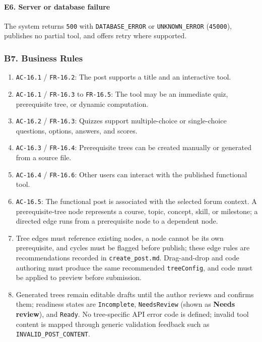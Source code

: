 \documentclass[12pt]{article}
\begin{document}
\hypertarget{sec:e6-server-or-database-failure}{}
\paragraph*{E6. Server or database failure}
\par\medskip

The system returns \texttt{500} with \texttt{DATABASE\_ERROR} or \texttt{UNKNOWN\_ERROR} (\texttt{45000}), publishes no partial tool, and offers retry where supported.
\par\medskip

\hypertarget{sec:b7-business-rules}{}
\subsubsection*{B7. Business Rules}
\par\medskip

\begin{enumerate}
\item \texttt{AC-16.1} / \texttt{FR-16.2}: The post supports a title and an interactive tool.
\item \texttt{AC-16.1} / \texttt{FR-16.3} to \texttt{FR-16.5}: The tool may be an immediate quiz, prerequisite tree, or dynamic computation.
\item \texttt{AC-16.2} / \texttt{FR-16.3}: Quizzes support multiple-choice or single-choice questions, options, answers, and scores.
\item \texttt{AC-16.3} / \texttt{FR-16.4}: Prerequisite trees can be created manually or generated from a source file.
\item \texttt{AC-16.4} / \texttt{FR-16.6}: Other users can interact with the published functional tool.
\item \texttt{AC-16.5}: The functional post is associated with the selected forum context. A prerequisite-tree node represents a course, topic, concept, skill, or milestone; a directed edge runs from a prerequisite node to a dependent node.
\item Tree edges must reference existing nodes, a node cannot be its own prerequisite, and cycles must be flagged before publish; these edge rules are recommendations recorded in \texttt{create\_post.md}. Drag-and-drop and code authoring must produce the same recommended \texttt{treeConfig}, and code must be applied to preview before submission.
\item Generated trees remain editable drafts until the author reviews and confirms them; readiness states are \texttt{Incomplete}, \texttt{NeedsReview} (shown as \textbf{Needs review}), and \texttt{Ready}. No tree-specific API error code is defined; invalid tool content is mapped through generic validation feedback such as \texttt{INVALID\_POST\_CONTENT}.
\end{enumerate}
\par\medskip
\end{document}
